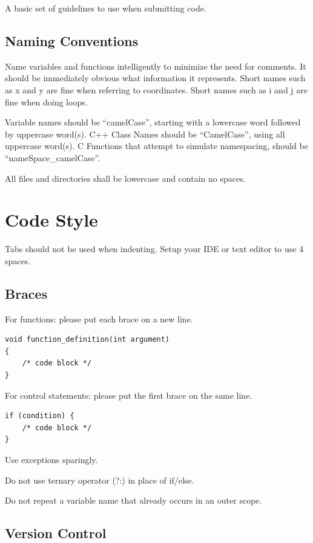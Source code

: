 \documentclass[a4paper, 11pt]{report}
\begin{document}
A basic set of guidelines to use when submitting code.

\subsection{Naming Conventions}

Name variables and functions intelligently to minimize the need for comments.
It should be immediately obvious what information it represents.
Short names such as x and y are fine when referring to coordinates.
Short names such as i and j are fine when doing loops.

Variable names should be ``camelCase'', starting with a lowercase word followed by uppercase word(s).
C++ Class Names should be ``CamelCase'', using all uppercase word(s).
C Functions that attempt to simulate namespacing, should be ``nameSpace\_camelCase''.

All files and directories shall be lowercase and contain no spaces.

\section{Code Style}

Tabs should not be used when indenting. Setup your IDE or text editor to use 4 spaces.

\subsection{Braces}

For functions: please put each brace on a new line.

\begin{lstlisting}
void function_definition(int argument)
{
    /* code block */
}
\end{lstlisting}

For control statements: please put the first brace on the same line.

\begin{lstlisting}
if (condition) {
    /* code block */    
}
\end{lstlisting}

Use exceptions sparingly.

Do not use ternary operator (?:) in place of if/else.

Do not repeat a variable name that already occurs in an outer scope.

\subsection{Version Control}
\end{document}
